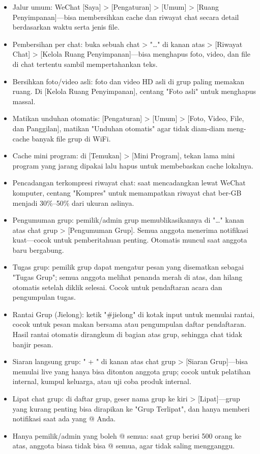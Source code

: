 
\begin{itemize}
  \item Jalur umum: WeChat [Saya] > [Pengaturan] > [Umum] > [Ruang Penyimpanan]—bisa membersihkan cache dan riwayat chat secara detail berdasarkan waktu serta jenis file.
  \item Pembersihan per chat: buka sebuah chat > "…" di kanan atas > [Riwayat Chat] > [Kelola Ruang Penyimpanan]—bisa menghapus foto, video, dan file di chat tertentu sambil mempertahankan teks.
  \item Bersihkan foto/video asli: foto dan video HD asli di grup paling memakan ruang. Di [Kelola Ruang Penyimpanan], centang "Foto asli" untuk menghapus massal.
  \item Matikan unduhan otomatis: [Pengaturan] > [Umum] > [Foto, Video, File, dan Panggilan], matikan "Unduhan otomatis" agar tidak diam-diam meng-cache banyak file grup di WiFi.
  \item Cache mini program: di [Temukan] > [Mini Program], tekan lama mini program yang jarang dipakai lalu hapus untuk membebaskan cache lokalnya.
  \item Pencadangan terkompresi riwayat chat: saat mencadangkan lewat WeChat komputer, centang "Kompres" untuk memampatkan riwayat chat ber-GB menjadi 30\%–50\% dari ukuran aslinya.
\end{itemize}


\begin{itemize}
  \item Pengumuman grup: pemilik/admin grup memublikasikannya di "…" kanan atas chat grup > [Pengumuman Grup]. Semua anggota menerima notifikasi kuat—cocok untuk pemberitahuan penting. Otomatis muncul saat anggota baru bergabung.
  \item Tugas grup: pemilik grup dapat mengatur pesan yang disematkan sebagai "Tugas Grup"; semua anggota melihat penanda merah di atas, dan hilang otomatis setelah diklik selesai. Cocok untuk pendaftaran acara dan pengumpulan tugas.
  \item Rantai Grup (Jielong): ketik "\#jielong" di kotak input untuk memulai rantai, cocok untuk pesan makan bersama atau pengumpulan daftar pendaftaran. Hasil rantai otomatis dirangkum di bagian atas grup, sehingga chat tidak banjir pesan.
  \item Siaran langsung grup: " + " di kanan atas chat grup > [Siaran Grup]—bisa memulai live yang hanya bisa ditonton anggota grup; cocok untuk pelatihan internal, kumpul keluarga, atau uji coba produk internal.
  \item Lipat chat grup: di daftar grup, geser nama grup ke kiri > [Lipat]—grup yang kurang penting bisa dirapikan ke "Grup Terlipat", dan hanya memberi notifikasi saat ada yang @ Anda.
  \item Hanya pemilik/admin yang boleh @ semua: saat grup berisi 500 orang ke atas, anggota biasa tidak bisa @ semua, agar tidak saling mengganggu.
\end{itemize}

